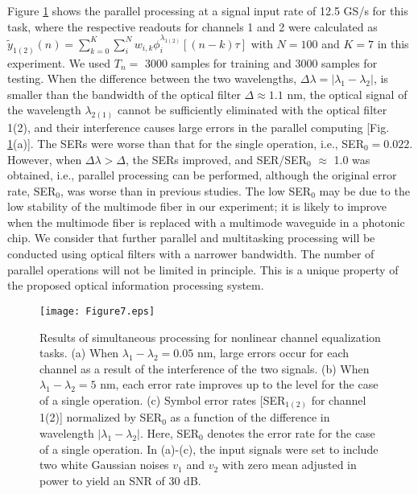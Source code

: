 \documentclass{article}
\begin{document}
Figure \ref{fig7} shows the parallel processing at a signal input rate
of 12.5 GS/s for this task, where 
the respective readouts for channels 1 and 2 were calculated as  
$\tilde{y}_{1(2)}(n) = \sum_{k=0}^K\sum_i^Nw_{i,k}\phi_i^{\lambda_{1(2)}}[(n-k)\tau]$
with $N = 100$ and $K = 7$ in this experiment.
%
We used $T_n =$ 3000 samples for training and 3000 samples for testing. 
%
When the difference between the two wavelengths, $\Delta \lambda = |\lambda_1-\lambda_2|$, 
 is smaller than the bandwidth of the optical filter 
$\Delta \approx 1.1$ nm, the optical signal
 of the wavelength $\lambda_{2(1)}$ cannot be sufficiently eliminated
 with the optical filter 1(2), and their interference causes large
 errors in the parallel computing [Fig. \ref{fig7}(a)]. 
%
The SERs were worse than that for the single operation, i.e., SER$_0 = 0.022$. 
%
However, when $\Delta\lambda > \Delta$, the SERs improved, and SER/SER$_0$ $\approx$
1.0 was obtained, i.e., parallel processing can be performed, 
although the original error rate, SER$_0$, was worse than in previous studies.
%
The low SER$_0$ may be due to the low stability of the multimode fiber
in our experiment; 
it is likely to improve when the multimode fiber is replaced with a
multimode waveguide in a photonic chip.
%
We consider that further parallel and
multitasking processing will be conducted using optical filters
with a narrower bandwidth.
%
The number of parallel operations will not be limited in principle. 
%
This is a unique property of the proposed optical information processing system.
%
\begin{figure}[htbp]
\centering\texttt{[image: Figure7.eps]}
\caption{\label{fig7}
Results of simultaneous processing for nonlinear channel equalization tasks.
%
(a) When $\lambda_1-\lambda_2 = 0.05$ nm, large errors occur for each
 channel as a result of the interference of the two signals.
(b) When $\lambda_1-\lambda_2 = 5$ nm, each error rate improves up to the
 level for the case of a single operation.
% 
(c) Symbol error rates [SER$_{1(2)}$ for channel 1(2)] normalized by SER$_0$ as a function of the
 difference in wavelength $|\lambda_1-\lambda_2|$.
%
Here, SER$_0$ denotes the error rate for the case of a single operation. 
%
In (a)-(c), the input signals were set to include two white Gaussian
 noises $v_1$ and $v_2$ with zero mean adjusted in power to yield an SNR
 of 30 dB. 
}
\end{figure}
%
\end{document}
